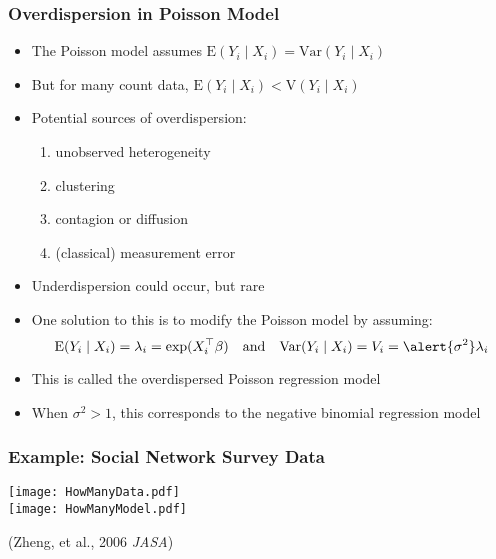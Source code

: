 \documentclass{beamer}
\begin{document}
\begin{frame}
  \frametitle{Overdispersion in Poisson Model}

  \begin{itemize}
  \item The Poisson model assumes $\text{E}(Y_i\mid X_i) = \text{Var}(Y_i\mid X_i)$
  \item But for many count data, $\text{E}(Y_i\mid X_i) < \text{V}(Y_i\mid X_i)$
\pause
  \item Potential sources of overdispersion:
    \begin{enumerate}
    \item unobserved heterogeneity
    \item clustering
    \item contagion or diffusion
    \item (classical) measurement error
    \end{enumerate}

\pause
  \item Underdispersion could occur, but rare

\medskip
\pause
  \item One solution to this is to modify the Poisson model by assuming:
    $$ \text{E}(Y_i\mid X_i) = \lambda_i = \exp(X_i^\top\beta) \quad \text{and} \quad
    \text{Var}(Y_i\mid X_i) = V_i = \alert{\sigma^2}\lambda_i $$
  \item This is called the \alert{overdispersed Poisson regression} model
\pause
  \item When $\sigma^2 > 1$, this corresponds to  the
   negative binomial regression model
  \end{itemize}

\end{frame}

\begin{frame}
\frametitle{Example: Social Network Survey Data}

\begin{center}
  \texttt{[image: HowManyData.pdf]}\\
  \texttt{[image: HowManyModel.pdf]}
\end{center}
\flushright(Zheng, et al., 2006 {\it JASA})


\end{frame}
\end{document}
